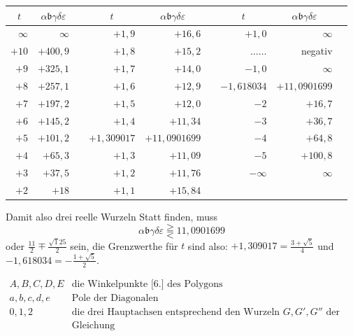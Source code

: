 \documentclass[12pt,a4paper]{article}
\begin{document}
\vspace{0.5em}

\begin{center}
\begin{tabular}{r|r|cr|r|cr|r|c}
\multicolumn{1}{c|}{$t$} & \multicolumn{1}{c|}{$\alpha\mathfrak{b}\gamma\delta\varepsilon$} &&
\multicolumn{1}{c|}{$t$} & \multicolumn{1}{c|}{$\alpha\mathfrak{b}\gamma\delta\varepsilon$} &&
\multicolumn{1}{c|}{$t$} & \multicolumn{1}{c}{$\alpha\mathfrak{b}\gamma\delta\varepsilon$} \\
\hline
$\infty$ & $\infty$ && $+1{,}9$ & $+16{,}6$ && $+1{,}0$ & $\infty$ \\
$+10$ & $+400{,}9$ && $+1{,}8$ & $+15{,}2$ && $\ldots\ldots$ & negativ \\
$+9$ & $+325{,}1$ && $+1{,}7$ & $+14{,}0$ && $-1{,}0$ & $\infty$ \\
$+8$ & $+257{,}1$ && $+1{,}6$ & $+12{,}9$ && $-1{,}618034$ & $+11{,}0901699$ \\
$+7$ & $+197{,}2$ && $+1{,}5$ & $+12{,}0$ && $-2$ & $+16{,}7$ \\
$+6$ & $+145{,}2$ && $+1{,}4$ & $+11{,}34$ && $-3$ & $+36{,}7$ \\
$+5$ & $+101{,}2$ && $+1{,}309017$ & $+11{,}0901699$ && $-4$ & $+64{,}8$ \\
$+4$ & $+65{,}3$ && $+1{,}3$ & $+11{,}09$ && $-5$ & $+100{,}8$ \\
$+3$ & $+37{,}5$ && $+1{,}2$ & $+11{,}76$ && $-\infty$ & $\infty$ \\
$+2$ & $+18$ && $+1{,}1$ & $+15{,}84$ &&& \\
\end{tabular}
\end{center}

\vspace{0.5em}

Damit also drei reelle Wurzeln Statt finden, muss
\[
\alpha\mathfrak{b}\gamma\delta\varepsilon \gtreqqless 11{,}0901699
\]
oder $\frac{11}{2} \mp \frac{\surd125}{2}$ sein, die Grenzwerthe f\"ur $t$ sind also: $+1{,}309017 = \frac{3+\surd5}{4}$ und $-1{,}618034 = -\frac{1+\surd5}{2}$.

\vspace{1em}

\noindent
$\begin{array}{ll}
A, B, C, D, E & \text{die Winkelpunkte [6.] des Polygons} \\
a, b, c, d, e & \text{Pole der Diagonalen} \\
0, 1, 2 & \text{die drei Hauptachsen entsprechend den Wurzeln } G, G', G'' \text{ der}\\
& \text{Gleichung}
\end{array}$
\end{document}
